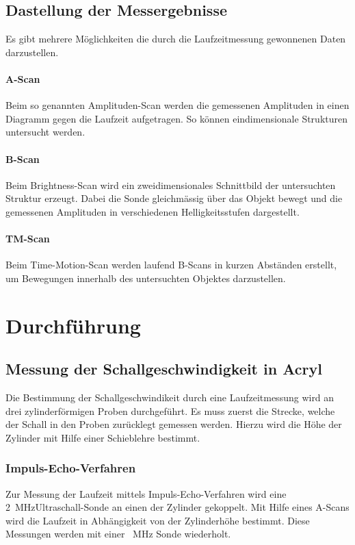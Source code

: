 \documentclass[11pt,ngerman,a4paper]{article}
\begin{document}
\subsection{Dastellung der Messergebnisse}
Es gibt mehrere M\"oglichkeiten die durch die Laufzeitmessung gewonnenen Daten darzustellen.
\paragraph{A-Scan} Beim so genannten Amplituden-Scan werden die gemessenen Amplituden in einen Diagramm gegen die Laufzeit aufgetragen. So k\"onnen eindimensionale Strukturen untersucht werden. 
\paragraph{B-Scan}
Beim Brightness-Scan wird ein zweidimensionales Schnittbild der untersuchten Struktur erzeugt. Dabei die Sonde gleichm\"assig \"uber das Objekt bewegt und die gemessenen Amplituden in verschiedenen Helligkeitsstufen dargestellt.  
\paragraph{TM-Scan} Beim Time-Motion-Scan werden laufend B-Scans in kurzen Abst\"anden erstellt, um Bewegungen innerhalb des untersuchten Objektes darzustellen.

\section{Durchf\"uhrung }

\subsection{Messung der Schallgeschwindigkeit in Acryl}
Die Bestimmung der Schallgeschwindikeit durch eine Laufzeitmessung wird an drei zylinderf\"ormigen Proben durchgef\"uhrt. Es muss zuerst die Strecke, welche der Schall in den Proben zur\"ucklegt gemessen werden. Hierzu wird die H\"ohe der Zylinder mit Hilfe einer Schieblehre bestimmt.  
\subsubsection{Impuls-Echo-Verfahren}
Zur Messung der Laufzeit mittels Impuls-Echo-Verfahren wird eine \SI{2}{\mega\hertz}Ultraschall-Sonde an einen der Zylinder gekoppelt. Mit Hilfe eines A-Scans wird die Laufzeit in Abh\"angigkeit von der Zylinderh\"ohe bestimmt. Diese Messungen werden mit einer \SI{}{\mega\hertz} Sonde wiederholt. 
\end{document}
